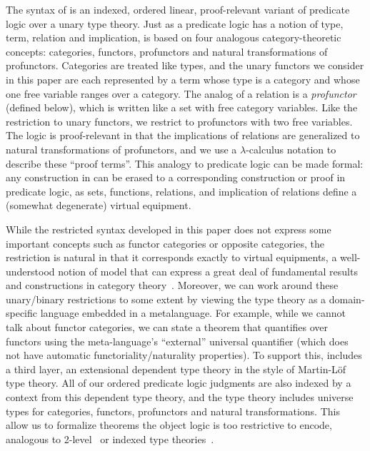 \documentclass{llncs}
\begin{document}
The syntax of \vett{} is an indexed, ordered linear, proof-relevant
variant of predicate logic over a unary type theory.
%
Just as a predicate logic has a notion of type, term, relation and
implication, \vett{} is based on four analogous category-theoretic
concepts: categories, functors, profunctors and natural transformations
of profunctors.
%
Categories are treated like types, and the unary functors we consider in
this paper are each represented by a term whose type is a category and
whose one free variable ranges over a category.
%
The analog of a relation is a \emph{profunctor} (defined below), which
is written like a set with free category variables.  Like the
restriction to unary functors, we restrict to profunctors with two free
variables.
%
The logic is proof-relevant in that the implications of relations are
generalized to natural transformations of profunctors, and we use a
$\lambda$-calculus notation to describe these ``proof terms''.
%
This analogy to predicate logic can be made formal: any construction in
\vett{} can be erased to a corresponding construction or proof in
predicate logic, as sets, functions, relations, and implication of
relations define a (somewhat degenerate) virtual equipment.

While the restricted syntax developed in this paper does not express
some important concepts such as functor categories or opposite
categories, the restriction is natural in that it corresponds exactly to
virtual equipments, a well-understood notion of model that can express a
great deal of fundamental results and constructions in category
theory~\cite{riehl_verity_2022,Shulman13}.
%
Moreover, we can work around these unary/binary restrictions to some
extent by viewing the type theory as a domain-specific language embedded
in a metalanguage.  For example, while we cannot talk about functor
categories, we can state a theorem that quantifies over functors using
the meta-language's ``external'' universal quantifier (which does not
have automatic functoriality/naturality properties).  To support this,
\vett{} includes a third layer, an extensional dependent type theory in
the style of Martin-L\"of type theory. All of our ordered predicate
logic judgments are also indexed by a context from this dependent
type theory, and the type theory includes universe types for categories,
functors, profunctors and natural transformations.  This allow us to
formalize theorems the object logic is too restrictive to encode, analogous to
2-level~\cite{voevodsky13hts,altenkirch+16strict,PALMGREN2019102715} or indexed type
theories~\cite{isaev21indexed,cervesatopfenning02llf,vakar15linear,krishnaswami+15linear}.
\end{document}
